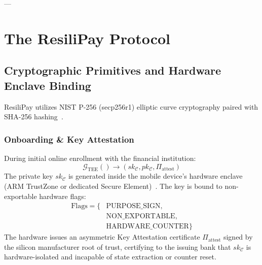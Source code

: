 \documentclass[conference]{IEEEtran}
\begin{document}
---

\section{The ResiliPay Protocol}

\subsection{Cryptographic Primitives and Hardware Enclave Binding}
ResiliPay utilizes NIST P-256 (secp256r1) elliptic curve cryptography paired with SHA-256 hashing~\cite{nist2013fips186}.

\subsubsection{Onboarding \& Key Attestation}
During initial online enrollment with the financial institution:
\begin{equation}
\mathcal{G}_{\text{TEE}}() \rightarrow (sk_{\mathcal{C}}, pk_{\mathcal{C}}, \Pi_{\text{attest}})
\end{equation}
The private key $sk_{\mathcal{C}}$ is generated inside the mobile device's hardware enclave (ARM TrustZone or dedicated Secure Element)~\cite{android2024keystore, apple2023secureenclave}. The key is bound to non-exportable hardware flags:
\begin{equation}
\begin{split}
\text{Flags} = \{ & \text{PURPOSE\_SIGN}, \\
                  & \text{NON\_EXPORTABLE}, \\
                  & \text{HARDWARE\_COUNTER} \}
\end{split}
\end{equation}
The hardware issues an asymmetric Key Attestation certificate $\Pi_{\text{attest}}$ signed by the silicon manufacturer root of trust, certifying to the issuing bank that $sk_{\mathcal{C}}$ is hardware-isolated and incapable of state extraction or counter reset.
\end{document}
